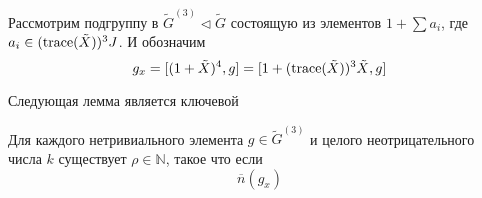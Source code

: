 Рассмотрим подгруппу в $\tilde{G}^{(3)}\triangleleft\tilde{G}$ состоящую из элементов $1 + \sum a_i$, где $a_i \in (\mathrm{trace}(\tilde{X}))^3 J$.
И обозначим \[g_x = [(1 + \tilde{X})^4, g] = [1 + (\mathrm{trace}(\tilde{X}))^3 \tilde{X}, g]\]

Следующая лемма является ключевой

\begin{lemma}
    Для каждого нетривиального элемента $g\in \tilde{G}^{(3)}$ и целого неотрицательного числа $k$ существует $\rho \in \mathbb{N}$, такое что если
    \[
        \overline{n}(g_x)
    \]
\end{lemma}